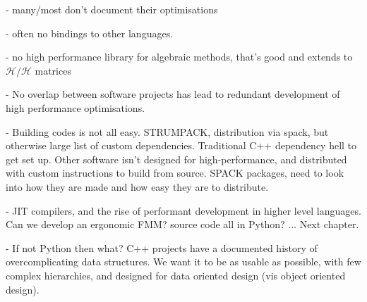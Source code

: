 - many/most don't document their optimisations

- often no bindings to other languages.

- no high performance library for algebraic methods, that's good and extends to $\mathcal{H}$/$\mathcal{H}$ matrices

- No overlap between software projects has lead to redundant development of high performance optimisations.

- Building codes is not all easy. STRUMPACK, distribution via spack, but otherwise large list of custom dependencies. Traditional C++ dependency hell to get set up. Other software isn't designed for high-performance, and distributed with custom instructions to build from source. SPACK packages, need to look into how they are made and how easy they are to distribute.

- JIT compilers, and the rise of performant development in higher level languages. Can we develop an ergonomic FMM? source code all in Python? ... Next chapter.

- If not Python then what? C++ projects have a documented history of overcomplicating data structures. We want it to be as usable as possible, with few complex hierarchies, and designed for data oriented design (vis object oriented design). 